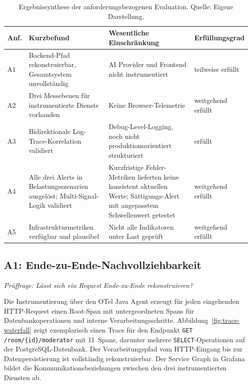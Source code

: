 \begin{table}[htb]
\centering
\caption[Ergebnissynthese der anforderungsbezogenen Evaluation.]{Ergebnissynthese der anforderungsbezogenen Evaluation. \small Quelle: Eigene Darstellung.}
\label{tab:eval-synthese}
\small
\begin{tabularx}{\textwidth}{l >{\RaggedRight\arraybackslash}X >{\RaggedRight\arraybackslash}X l}
\toprule
\textbf{Anf.} & \textbf{Kurzbefund} & \textbf{Wesentliche Einschränkung} & \textbf{Erfüllungsgrad} \\
\midrule
A1 & Backend-Pfad rekonstruierbar, Gesamtsystem unvollständig & AI Provider und Frontend nicht instrumentiert & teilweise erfüllt \\[4pt]
A2 & Drei Messebenen für instrumentierte Dienste vorhanden & Keine Browser-Telemetrie & weitgehend erfüllt \\[4pt]
A3 & Bidirektionale Log-Trace-Korrelation validiert & Debug-Level-Logging, noch nicht produktionsorientiert strukturiert & erfüllt \\[4pt]
A4 & Alle drei Alerts in Belastungsszenarien ausgelöst; Multi-Signal-Logik validiert & Kurzfristige Fehler-Metriken lieferten keine konsistent aktuellen Werte; Sättigungs-Alert mit angepasstem Schwellenwert getestet & weitgehend erfüllt \\[4pt]
A5 & Infrastrukturmetriken verfügbar und plausibel & Nicht alle Indikatoren unter Last geprüft & weitgehend erfüllt \\
\bottomrule
\end{tabularx}
\end{table}


\subsection{A1: Ende-zu-Ende-Nachvollziehbarkeit}

\emph{Prüffrage: Lässt sich ein Request Ende-zu-Ende rekonstruieren?}

Die Instrumentierung über den OTel Java Agent erzeugt für jeden eingehenden HTTP-Request einen Root-Span mit untergeordneten Spans für Datenbankoperationen und interne Verarbeitungsschritte. Abbildung~\ref{fig:trace-waterfall} zeigt exemplarisch einen Trace für den Endpunkt \texttt{GET /room/\{id\}/moderator} mit 11~Spans, darunter mehrere \texttt{SELECT}-Operationen auf der PostgreSQL-Datenbank. Der Verarbeitungspfad vom HTTP-Eingang bis zur Datenpersistierung ist vollständig rekonstruierbar. Der Service Graph in Grafana bildet die Kommunikationsbeziehungen zwischen den drei instrumentierten Diensten ab.

